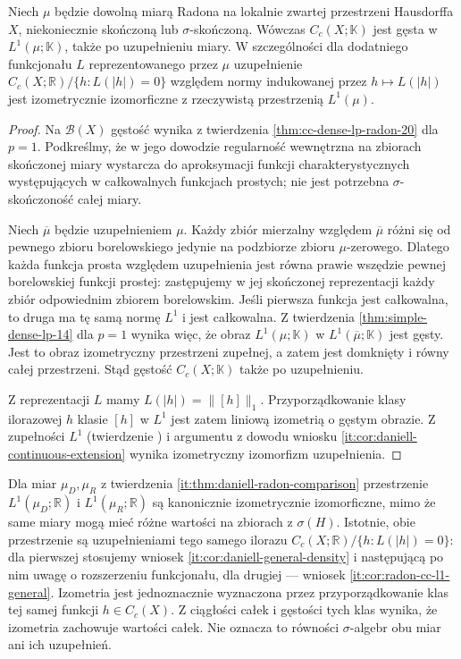 \begin{wniosek}
\label{it:cor:radon-cc-l1-general}
Niech $\mu$ będzie dowolną miarą Radona na lokalnie
zwartej przestrzeni Hausdorffa $X$, niekoniecznie
skończoną lub $\sigma$-skończoną.
Wówczas $C_c(X;\mathbb K)$ jest gęsta w
$L^1(\mu;\mathbb K)$, także po uzupełnieniu miary.
W szczególności dla dodatniego funkcjonału $L$
reprezentowanego przez $\mu$ uzupełnienie
$C_c(X;\mathbb R)/\{h:L(|h|)=0\}$ względem
normy indukowanej przez $h\mapsto L(|h|)$
jest izometrycznie izomorficzne z rzeczywistą
przestrzenią $L^1(\mu)$.
\end{wniosek}
\begin{proof}
Na $\mathcal B(X)$ gęstość wynika z twierdzenia
\ref{thm:cc-dense-lp-radon-20} dla $p=1$. Podkreślmy,
że w jego dowodzie regularność wewnętrzna na zbiorach
skończonej miary wystarcza do aproksymacji funkcji
charakterystycznych występujących w całkowalnych
funkcjach prostych; nie jest potrzebna
$\sigma$-skończoność całej miary.

Niech $\overline\mu$ będzie uzupełnieniem $\mu$.
Każdy zbiór mierzalny względem $\overline\mu$
różni się od pewnego zbioru borelowskiego
jedynie na podzbiorze zbioru $\mu$-zerowego.
Dlatego każda funkcja prosta względem uzupełnienia
jest równa prawie wszędzie pewnej borelowskiej
funkcji prostej: zastępujemy w jej skończonej
reprezentacji każdy zbiór odpowiednim zbiorem
borelowskim. Jeśli pierwsza funkcja jest całkowalna,
to druga ma tę samą normę $L^1$ i jest całkowalna.
Z twierdzenia \ref{thm:simple-dense-lp-14}
dla $p=1$ wynika więc, że obraz $L^1(\mu;\mathbb K)$
w $L^1(\overline\mu;\mathbb K)$ jest gęsty.
Jest to obraz izometryczny przestrzeni zupełnej,
a zatem jest domknięty i równy całej przestrzeni.
Stąd gęstość $C_c(X;\mathbb K)$ także po uzupełnieniu.

Z reprezentacji $L$ mamy $L(|h|)=\|[h]\|_1$.
Przyporządkowanie klasy ilorazowej $h$ klasie $[h]$
w $L^1$ jest zatem liniową izometrią o gęstym obrazie.
Z zupełności $L^1$ (twierdzenie
) i argumentu z dowodu
wniosku \ref{it:cor:daniell-continuous-extension}
wynika izometryczny izomorfizm uzupełnienia.
\end{proof}

\begin{uwaga}
Dla miar $\mu_D,\mu_R$ z twierdzenia
\ref{it:thm:daniell-radon-comparison} przestrzenie
$L^1(\mu_D;\mathbb R)$ i $L^1(\mu_R;\mathbb R)$
są kanonicznie izometrycznie izomorficzne, mimo że
same miary mogą mieć różne wartości na zbiorach
z $\sigma(H)$. Istotnie, obie przestrzenie są
uzupełnieniami tego samego ilorazu
$C_c(X;\mathbb R)/\{h:L(|h|)=0\}$:
dla pierwszej stosujemy wniosek
\ref{it:cor:daniell-general-density} i następującą
po nim uwagę o rozszerzeniu funkcjonału,
dla drugiej --- wniosek
\ref{it:cor:radon-cc-l1-general}.
Izometria jest jednoznacznie wyznaczona przez
przyporządkowanie klas tej samej funkcji $h\in C_c(X)$.
Z ciągłości całek i gęstości tych klas wynika,
że izometria zachowuje wartości całek.
Nie oznacza to równości $\sigma$-algebr obu miar
ani ich uzupełnień.
\end{uwaga}


